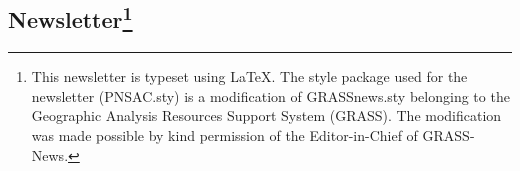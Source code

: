 \address{Roger Button, BA. MA. LLB.\\
Corporate Secretary\\
}

\address{Paul Labranche\\
Treasurer\\
}

  
\subsection{Newsletter\protect\footnote{This newsletter is typeset using
    \LaTeX.  The style package used for the newsletter (PNSAC.sty) is
    a modification of GRASSnews.sty belonging to the Geographic
    Analysis Resources Support System (GRASS). The modification was
    made possible by kind permission of the Editor-in-Chief of
    GRASS-News.}}


\small\address{Editor: Bruce Grant\\
\small{}}








